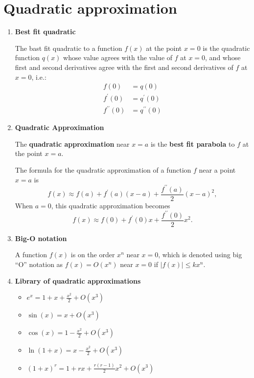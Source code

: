 \section{Quadratic approximation}
\begin{enumerate}
    \item \textbf{Best fit quadratic}

        The bast fit quadratic to a function $f(x)$ at the point $x=0$ is the quadratic function $q(x)$ whose value agrees with the value of $f$ at $x=0$, and whose first and second derivatives agree with the first and second derivatives of $f$ at $x=0$, i.e.:
        \begin{align*}
            f(0) & =q(0) \\
            f^\prime (0) & =q^\prime (0) \\
            f^{\prime\prime}(0) & =q^{\prime\prime}(0)
        \end{align*}
    \item \textbf{Quadratic Approximation}

        The \textbf{quadratic approximation} near $x=a$ is the \textbf{best fit parabola} to $f$ at the point $x=a$.

        The formula for the quadratic approximation of a function $f$ near a point $x=a$ is 
        $$
        f(x)\approx f(a)+f^\prime (a)(x-a)+\frac{f^{\prime\prime}(a)}{2}(x-a)^2,
        $$
        When $a=0$, this quadratic approximation becomes
        $$
        f(x)\approx f(0)+f^\prime (0)x+\frac{f^{\prime\prime}(0)}{2}x^2.
        $$
    \item \textbf{Big-O notation}

        A function $f(x)$ is on the order $x^n$ near $x=0$, which is denoted using big ``O'' notation as $f(x)=O(x^n)$ near $x=0$ if $|f(x)|\leq kx^n$.
    \item \textbf{Library of quadratic approximations}
        \begin{itemize}
            \item $e^x=1+x+\frac{x^2}{2}+O(x^3)$
            \item $\sin(x)=x+O(x^3)$
            \item $\cos(x)=1-\frac{x^2}{2}+O(x^3)$
            \item $\ln(1+x)=x-\frac{x^2}{2}+O(x^3)$
            \item $(1+x)^r=1+rx+\frac{r(r-1)}{2}x^2+O(x^3)$
        \end{itemize}
\end{enumerate}

